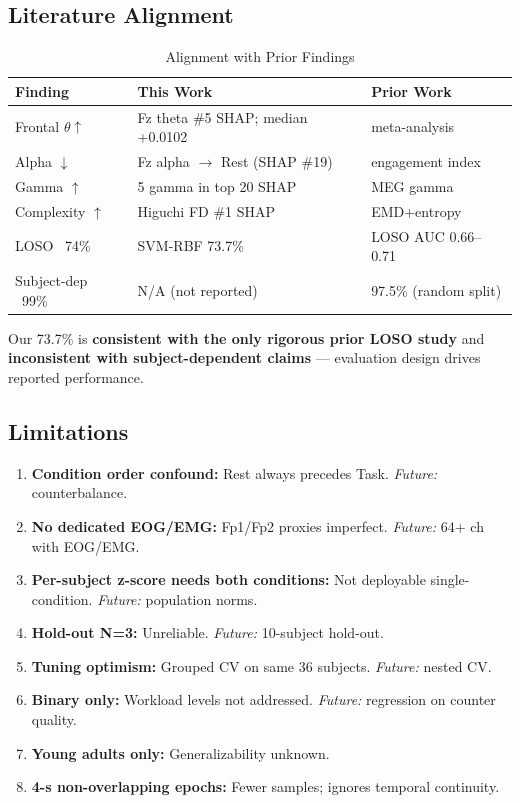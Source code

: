 \documentclass[conference]{IEEEtran}
\begin{document}
\subsection{Literature Alignment}
\begin{table}[htbp]
\caption{Alignment with Prior Findings}
\label{tab:align}
\centering
\begin{tabular}{@{}lll@{}}
\toprule
Finding & This Work & Prior Work \\
\midrule
Frontal $\theta \uparrow$ & Fz theta \#5 SHAP; median +0.0102 & \cite{chikhi2022eeg} meta-analysis \\
Alpha $\downarrow$ & Fz alpha $\rightarrow$ Rest (SHAP \#19) & \cite{berka2007eeg} engagement index \\
Gamma $\uparrow$ & 5 gamma in top 20 SHAP & \cite{ishii2014frontal} MEG gamma \\
Complexity $\uparrow$ & Higuchi FD \#1 SHAP & \cite{aslam2025electroencephalograph} EMD+entropy \\
LOSO ~74\% & SVM-RBF 73.7\% & \cite{sibisanu2026high} LOSO AUC 0.66–0.71 \\
Subject-dep ~99\% & N/A (not reported) & \cite{nath2020eeg} 97.5\% (random split) \\
\bottomrule
\end{tabular}
\end{table}

Our 73.7\% is \textbf{consistent with the only rigorous prior LOSO study} and \textbf{inconsistent with subject-dependent claims} — evaluation design drives reported performance.

\subsection{Limitations}
\label{sec:limitations}
\begin{enumerate}
    \item \textbf{Condition order confound:} Rest always precedes Task. \textit{Future:} counterbalance.
    \item \textbf{No dedicated EOG/EMG:} Fp1/Fp2 proxies imperfect. \textit{Future:} 64+ ch with EOG/EMG.
    \item \textbf{Per-subject z-score needs both conditions:} Not deployable single-condition. \textit{Future:} population norms.
    \item \textbf{Hold-out N=3:} Unreliable. \textit{Future:} 10-subject hold-out.
    \item \textbf{Tuning optimism:} Grouped CV on same 36 subjects. \textit{Future:} nested CV.
    \item \textbf{Binary only:} Workload levels not addressed. \textit{Future:} regression on counter quality.
    \item \textbf{Young adults only:} Generalizability unknown.
    \item \textbf{4-s non-overlapping epochs:} Fewer samples; ignores temporal continuity.
\end{enumerate}
\end{document}
